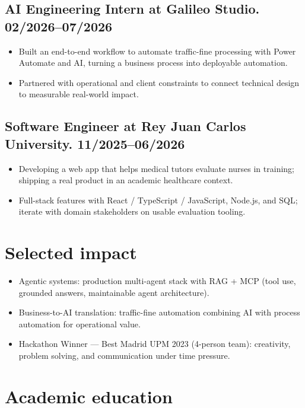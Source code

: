 \documentclass{article}
\begin{document}
\subsection*{\hspace{0.25cm} AI Engineering Intern at Galileo Studio. 02/2026--07/2026}
\begin{itemize}
    \item Built an end-to-end workflow to automate traffic-fine processing with Power Automate and AI, turning a business process into deployable automation.

    \item Partnered with operational and client constraints to connect technical design to measurable real-world impact.
\end{itemize}

\subsection*{\hspace{0.25cm} Software Engineer at Rey Juan Carlos University. 11/2025--06/2026}
\begin{itemize}
    \item Developing a web app that helps medical tutors evaluate nurses in training; shipping a real product in an academic healthcare context.

    \item Full-stack features with React / TypeScript / JavaScript, Node.js, and SQL; iterate with domain stakeholders on usable evaluation tooling.
\end{itemize}

\section*{Selected impact}

\begin{itemize}
    \item Agentic systems: production multi-agent stack with RAG + MCP (tool use, grounded answers, maintainable agent architecture).
    \item Business-to-AI translation: traffic-fine automation combining AI with process automation for operational value.
    \item Hackathon Winner --- Best Madrid UPM 2023 (4-person team): creativity, problem solving, and communication under time pressure.
\end{itemize}

\section*{Academic education}
\end{document}
